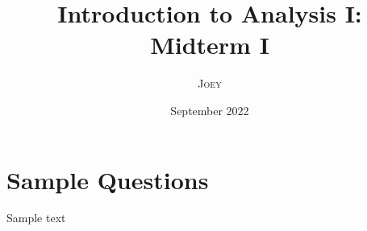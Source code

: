 \documentclass{article}
\title{Introduction to Analysis I: Midterm I}
\author{\textsc{Joey}}
\date{September 2022}
\newcommand{\<}{\langle}
\renewcommand{\>}{\rangle}
\begin{document}
\maketitle
		\section{Sample Questions}
    Sample text
\end{document}

